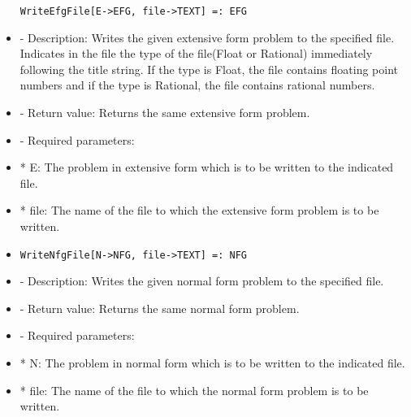 \begin{itemize}
\begin{verbatim}
WriteEfgFile[E->EFG, file->TEXT] =: EFG
\end{verbatim}

\bd
\item
- Description:  Writes the given extensive form problem to the specified 
file.  Indicates in the file the type of the file(Float or Rational) 
immediately following the title string.  If the type is Float, the file
contains floating point numbers and if the type is Rational, the file
contains rational numbers.  
\item
- Return value:  Returns the same extensive form problem.
\item
- Required parameters:

\bd
\item
*  E:  The problem in extensive form which is to be written to the
indicated file.
\item
*  file:  The name of the file to which the extensive form problem is
to be written.
\ed
\ed

\item

\begin{verbatim}
WriteNfgFile[N->NFG, file->TEXT] =: NFG
\end{verbatim}

\bd
\item
- Description:  Writes the given normal form problem to the specified 
file.  
\item
- Return value:  Returns the same normal form problem.
\item
- Required parameters:

\bd
\item
*  N:  The problem in normal form which is to be written to the
indicated file.
\item
*  file:  The name of the file to which the normal form problem is
to be written.
\ed
\ed

\end{itemize}





























